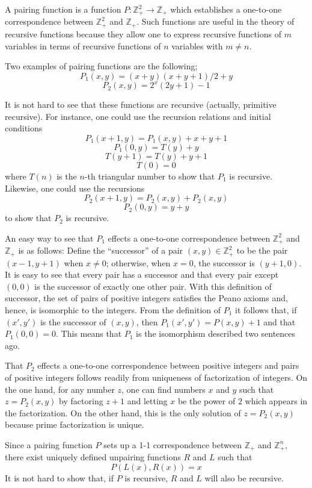\documentclass[12pt]{article}
\begin{document}
A pairing function is a function $P \colon \mathbb{Z}_+^2 \to \mathbb{Z}_+$ which establishes a one-to-one correspondence between $\mathbb{Z}_+^2$ and $\mathbb{Z}_+$.  Such functions are useful in the theory of recursive functions because they allow one to express recursive functions of $m$ variables in terms of recursive functions of $n$ variables with $m \ne n$.

Two examples of pairing functions are the following;
 $$P_1 (x,y) = (x+y)(x+y+1)/2 + y$$
 $$P_2 (x,y) = 2^x (2y + 1) - 1$$

It is not hard to see that these functions are recursive (actually, primitive recursive).  For instance, one could use the recursion relations and initial conditions
 $$P_1 (x+1,y) = P_1(x,y) + x + y + 1$$
 $$P_1 (0,y) = T(y) + y$$
 $$T(y+1) = T(y) + y + 1$$
 $$T(0) = 0$$
where $T(n)$ is the $n$-th triangular number to show that $P_1$ is recursive. Likewise, one could use the recursions
 $$P_2 (x+1,y) = P_2 (x,y) + P_2 (x,y)$$
 $$P_2 (0,y) = y + y$$
to show that $P_2$ is recursive.

An easy way to see that $P_1$ effects a one-to-one correspondence between $\mathbb{Z}_+^2$ and $\mathbb{Z}_+$ is as follows:  Define the ``successor'' of a pair $(x,y) \in \mathbb{Z}_+^2$ to be the pair $(x-1,y+1)$ when $x\neq0$; otherwise, when $x=0$, the successor is $(y+1,0)$.  It is easy to see that every pair has a successor and that every pair except $(0,0)$ is the successor of exactly one other pair.  With this definition of successor, the set of pairs of positive integers satisfies the Peano axioms and, hence, is isomorphic to the integers.  From the definition of $P_1$ it follows that, if $(x',y')$ is the successor of $(x,y)$, then $P_1 (x',y') = P(x,y) + 1$ and that $P_1(0,0) = 0$.  This means that $P_1$ is the isomorphism described two sentences ago.

That $P_2$ effects a one-to-one correspondence between positive integers and pairs of positive integers follows readily from uniqueness of factorization of integers.  On the one hand, for any number $z$, one can find numbers $x$ and $y$ such that $z = P_2 (x,y)$ by factoring $z+1$ and letting $x$ be the power of $2$ which appears in the factorization.  On the other hand, this is the only solution of $z = P_2 (x,y)$ because prime factorization is unique.

Since a pairing function $P$ sets up a 1-1 correspondence between $\mathbb{Z}_+$ and $\mathbb{Z}_+^n$, there exist uniquely defined unpairing functions $R$ and $L$ such that
 $$P(L(x),R(x)) = x$$
It is not hard to show that, if $P$ is recursive, $R$ and $L$ will also be recursive.
\end{document}
